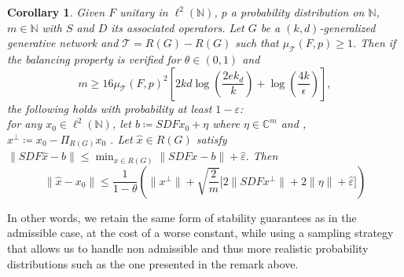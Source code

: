 \documentclass[a4paper,oneside]{amsart}
\newtheorem{corollary}[theorem]{Corollary}
\newcommand{\N}{\mathbb{N}}
\newcommand{\lnn}{\ell^2(\mathbb{N})}
\begin{document}
\begin{corollary}\label{cor:balancing-bound}
    Given $F$ unitary in $\lnn$, $p$ a probability distribution on $\mathbb{N}$, $m \in \N$ with $S$ and $D$ its associated operators. Let  $G$ be a $(k, d)$-generalized generative network and $\mathcal{T} = R(G) - R(G)$ such that $\mu_{\mathcal{T}}(F,p)\geq 1$. Then if the balancing property is verified for $\theta \in (0,1)$ and
    \begin{equation*}
        m \geq 16 \mu_\mathcal{T}(F,p)^2  \left[ 2kd \log\left(\frac{2e k_d}{k}\right) + \log\left(\frac{4k}{\epsilon}\right) \right], 
    \end{equation*}
    the following holds with probability at least $1-\varepsilon$:\\
    for any $x_0 \in \lnn $, let $b \coloneqq SDFx_0 + \eta$ where $\eta \in \mathbb{C}^{m}$ and ,  $x^\perp \coloneqq  x_0 - \Pi_{R(G)}x_0$ . Let $\hat{x} \in R(G)$ satisfy $\lVert SDF\hat{x} -b \rVert \leq \min_{x\in R(G)} \lVert SDFx - b \rVert + \hat{\varepsilon}.$ Then
    \begin{equation*}
        \lVert \hat{x} - x_0 \rVert\leq \frac{1}{1-\theta}\left(\lVert x^\perp \rVert+\sqrt{\frac{2}{m}} \Big[2 \lVert SDF x^\perp \rVert + 2\lVert\eta \rVert +\hat{\varepsilon} \Big]\right)
    \end{equation*}
\end{corollary}
In other words, we retain the same form of stability guarantees as in the admissible case, at the cost of a worse constant, while using a sampling strategy that allows us to handle non admissible and thus more realistic probability distributions such as the one presented in the remark above.
\end{document}

